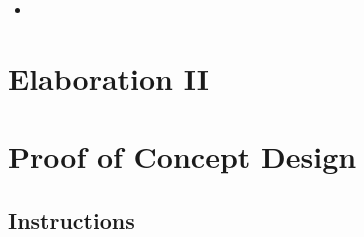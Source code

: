 \documentclass{article}
\begin{document}
\begin{itemize}
    \item 
\end{itemize}

\section{Elaboration II}

\section{Proof of Concept Design}

\subsection{Instructions}
\end{document}
